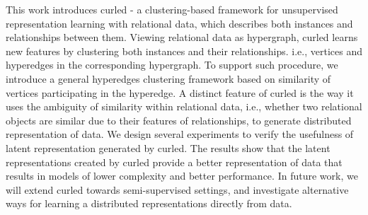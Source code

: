 This work introduces \gls{curled} - a clustering-based framework for unsupervised representation learning with relational data, which describes both instances and relationships between them.
Viewing relational data as hypergraph, \gls{curled} learns new features by clustering both instances and their relationships. i.e., vertices and hyperedges in the corresponding hypergraph.
To support such procedure, we introduce a general hyperedges clustering framework based on similarity of vertices participating in the hyperedge.
A distinct feature of \gls{curled} is the way it uses the ambiguity of similarity within relational data, i.e., whether two relational objects are similar due to their features of relationships, to generate distributed representation of data.
We design several experiments to verify the usefulness of latent representation generated by \gls{curled}.
The results show that the latent representations created by \gls{curled} provide a better representation of data that results in models of lower complexity and better performance. 
In future work, we will extend \gls{curled} towards semi-supervised settings, and investigate alternative ways for learning a distributed representations directly from data.



\cleardoublepage

